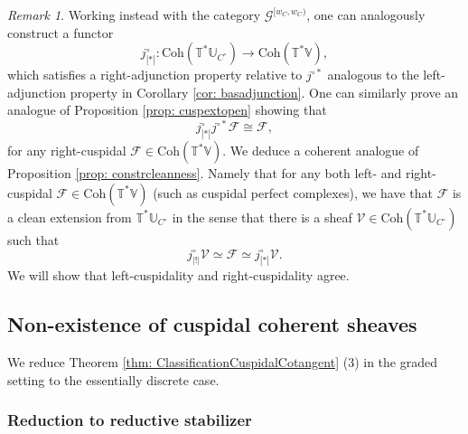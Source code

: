 \documentclass{amsart}
\theoremstyle{definition}
\theoremstyle{remark}
\newtheorem{remark}[theorem]{Remark}
\numberwithin{equation}{section}
\newcommand{\U}{\mathbb{U}}
\newcommand{\mc}{\mathcal}
\newcommand{\Coh}{\mathrm{Coh}}
\newcommand{\V}{\mathbb{V}}
\newcommand{\T}{\mathbb{T}}
\newcommand{\ush}{\lvert ! \rvert}
\begin{document}
\begin{remark}{\label{rem: cohcleanness}}
    Working instead with the category $\mc{G}^{[w_C, w_C)}$, one can analogously construct a functor 
    \begin{equation*}
        j^{\circ}_{|\ast|}: \Coh(\T^{\ast}\U_{C^{\circ}}) \rightarrow \Coh(\T^{\ast}\V),
    \end{equation*}
which satisfies a right-adjunction property relative to $j^{\circ \ast}$ analogous to the left-adjunction property in Corollary \ref{cor: basadjunction}. One can similarly prove an analogue of Proposition \ref{prop: cuspextopen} showing that 
\begin{equation*}
    j^{\circ}_{|\ast|}j^{\circ \ast}\mc{F} \cong \mc{F},
\end{equation*}
for any right-cuspidal $\mc{F} \in \Coh(\T^{\ast}\V)$. We deduce a coherent analogue of Proposition \ref{prop: constrcleanness}. Namely that for any both left- and right- cuspidal $\mc{F} \in \Coh(\T^{\ast}\V)$ (such as cuspidal perfect complexes), we have that $\mc{F}$ is a clean extension from $\T^{\ast} \U_{C^{\circ}}$ in the sense that there is a sheaf $\mc{V} \in \Coh(\T^{\ast}\U_{C^{\circ}})$ such that
\begin{equation*}
    j^{\circ}_{\ush}\mc{V} \simeq \mc{F} \simeq j^{\circ}_{|\ast|} \mc{V}.
\end{equation*}
We will show that left-cuspidality and right-cuspidality agree. 
\end{remark}

\subsection{Non-existence of cuspidal coherent sheaves}{\label{ss: reductiondiscClassificationCuspidalCotangent}}
We reduce Theorem \ref{thm: ClassificationCuspidalCotangent} (3) in the graded setting to the essentially discrete case.  

\subsubsection{Reduction to reductive stabilizer}{\label{sss: cuspreductiontoreductive}}
\end{document}
